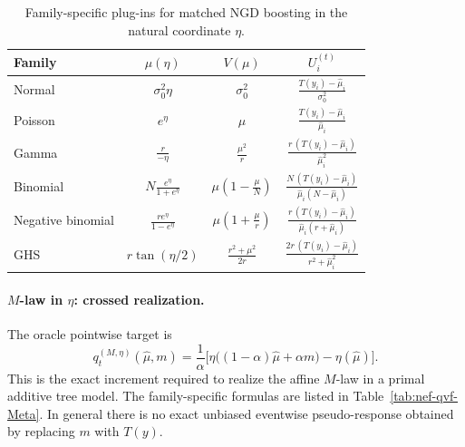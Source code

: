 \documentclass[11pt]{article}
\begin{document}
\begin{table}[t]
\centering
\renewcommand{\arraystretch}{1.3}
\setlength{\tabcolsep}{4.5pt}
\begin{tabular}{lccc}
\hline
Family & \(\mu(\eta)\) & \(V(\mu)\) & \(U_i^{(t)}\) \\
\hline
Normal
&
\(\displaystyle \sigma_0^2\eta\)
&
\(\displaystyle \sigma_0^2\)
&
\(\displaystyle \frac{T(y_i)-\hat\mu_i}{\sigma_0^2}\)
\\[1.2ex]

Poisson
&
\(\displaystyle e^\eta\)
&
\(\displaystyle \mu\)
&
\(\displaystyle \frac{T(y_i)-\hat\mu_i}{\hat\mu_i}\)
\\[1.2ex]

Gamma
&
\(\displaystyle \frac{r}{-\eta}\)
&
\(\displaystyle \frac{\mu^2}{r}\)
&
\(\displaystyle \frac{r\,(T(y_i)-\hat\mu_i)}{\hat\mu_i^2}\)
\\[1.2ex]

Binomial
&
\(\displaystyle N\frac{e^\eta}{1+e^\eta}\)
&
\(\displaystyle \mu\left(1-\frac{\mu}{N}\right)\)
&
\(\displaystyle \frac{N\,(T(y_i)-\hat\mu_i)}{\hat\mu_i(N-\hat\mu_i)}\)
\\[1.2ex]

Negative binomial
&
\(\displaystyle \frac{re^\eta}{1-e^\eta}\)
&
\(\displaystyle \mu\left(1+\frac{\mu}{r}\right)\)
&
\(\displaystyle \frac{r\,(T(y_i)-\hat\mu_i)}{\hat\mu_i(r+\hat\mu_i)}\)
\\[1.2ex]

GHS
&
\(\displaystyle r\tan(\eta/2)\)
&
\(\displaystyle \frac{r^2+\mu^2}{2r}\)
&
\(\displaystyle \frac{2r\,(T(y_i)-\hat\mu_i)}{r^2+\hat\mu_i^2}\)
\\[1.2ex]
\hline
\end{tabular}
\caption{Family-specific plug-ins for matched NGD boosting in the natural coordinate \(\eta\).}
\label{tab:nef-qvf-Neta}
\end{table}

\paragraph{\(M\)-law in \(\eta\): crossed realization.}
The oracle pointwise target is
\[
q_t^{(M,\eta)}(\hat\mu,m)
=
\frac{1}{\alpha}
\Big[
\eta\big((1-\alpha)\hat\mu+\alpha m\big)-\eta(\hat\mu)
\Big].
\]
This is the exact increment required to realize the affine \(M\)-law in a primal additive tree model. The family-specific formulas are listed in Table~\ref{tab:nef-qvf-Meta}. In general there is no exact unbiased eventwise pseudo-response obtained by replacing \(m\) with \(T(y)\).
\end{document}
